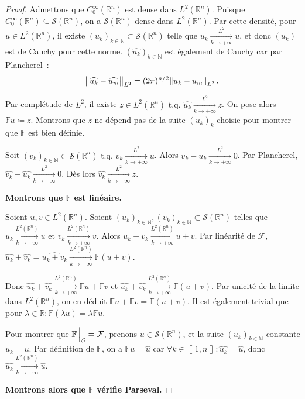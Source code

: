 \documentclass{report}
\newcommand{\R}{{\mathbb R}}
\newcommand{\N}{{\mathbb N}}
\newcommand{\tq}{\text{ t.q. }}
\newcommand{\pinfty}{{+\infty}}
\newcommand{\intint}[2]{{\left\llbracket#1, #2\right\rrbracket}}
\theoremstyle{definition}
\theoremstyle{remark}
\begin{document}
\begin{proof} Admettons que $C_0^\infty(\R^n)$ est dense dans $L^2(\R^n)$. Puisque $C_0^\infty(\R^n) \subseteq \mathcal S(\R^n)$, on a $\mathcal S(\R^n)$ dense dans $L^2(\R^n)$.
Par cette densité, pour $u \in L^2(\R^n)$, il existe $(u_k)_{k \in \N} \subset \mathcal S(\R^n)$ telle que $u_k \xrightarrow[k \to \pinfty]{L^2} u$, et donc $(u_k)$ est de
Cauchy pour cette norme. $(\widehat {u_k})_{k \in \N}$ est également de Cauchy car par Plancherel~:
\[\norm {\widehat {u_k} - \widehat {u_m}}_{L^2} = (2\pi)^{n/2}\norm {u_k - u_m}_{L^2}.\]

Par complétude de $L^2$, il existe $z \in L^2(\R^n) \tq \widehat {u_k} \xrightarrow[k \to \pinfty]{L^2} z$. On pose alors $\mathbb Fu \coloneqq z$. Montrons que $z$ ne dépend pas
de la suite $(u_k)_k$ choisie pour montrer que $\mathbb F$ est bien définie.

Soit $(v_k)_{k \in \N} \subset \mathcal S(\R^n) \tq v_k \xrightarrow[k \to \pinfty]{L^2} u$. Alors $v_k-u_k \xrightarrow[k \to \pinfty]{L^2} 0$. Par Plancherel,
$\widehat {v_k}-\widehat {u_k} \xrightarrow[k \to \pinfty]{L^2} 0$. Dès lors $\widehat {v_k} \xrightarrow[k \to \pinfty]{L^2} z$.

\textbf{Montrons que $\mathbb F$ est linéaire.}

Soient $u, v \in L^2(\R^n)$. Soient $(u_k)_{k \in \N}, (v_k)_{k \in \N} \subset \mathcal S(\R^n)$ telles que $u_k \xrightarrow[k \to \pinfty]{L^2(\R^n)} u$ et
$v_k \xrightarrow[k \to \pinfty]{L^2(\R^n)} v$. Alors $u_k+v_k \xrightarrow[k \to \pinfty]{L^2(\R^n)} u+v$. Par linéarité de $\mathcal F$,
$\widehat {u_k} + \widehat {v_k} = \widehat {u_k + v_k} \xrightarrow[k \to \pinfty]{L^2(\R^n)} \mathbb F(u+v)$.

Donc $\widehat {u_k} + \widehat {v_k} \xrightarrow[k \to \pinfty]{L^2(\R^n)} \mathbb Fu + \mathbb Fv$ et
$\widehat {u_k} + \widehat {v_k} \xrightarrow[k \to \pinfty]{L^2(\R^n)} \mathbb F(u+v)$. Par unicité de la limite dans $L^2(\R^n)$, on en déduit
$\mathbb F u + \mathbb F v = \mathbb F(u+v)$. Il est également trivial que pour $\lambda \in \R : \mathbb F(\lambda u) = \lambda \mathbb Fu$.

Pour montrer que $\mathbb F\sVert[2]_{\mathcal S} = \mathcal F$, prenons $u \in \mathcal S(\R^n)$, et la suite $(u_k)_{k \in \N}$ constante $u_k = u$. Par définition de $\mathbb F$,
on a $\mathbb Fu = \hat u$ car $\forall k \in \intint 1n : \widehat {u_k} = \hat u$, donc $\widehat {u_k} \xrightarrow[k \to \pinfty]{L^2(\R^n)} \hat u$.

\textbf{Montrons alors que $\mathbb F$  vérifie Parseval.}


\end{proof}
\end{document}
